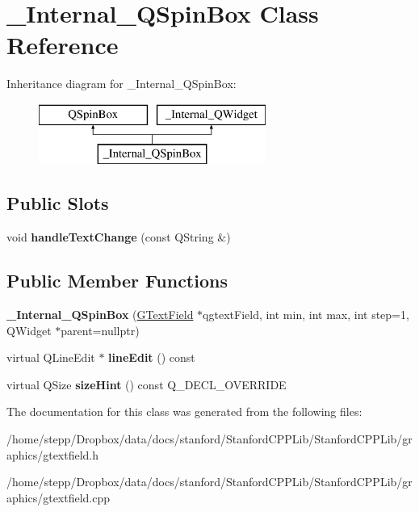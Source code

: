 \hypertarget{class__Internal__QSpinBox}{}\section{\+\_\+\+Internal\+\_\+\+Q\+Spin\+Box Class Reference}
\label{class__Internal__QSpinBox}
Inheritance diagram for \+\_\+\+Internal\+\_\+\+Q\+Spin\+Box\+:\begin{figure}[H]
\begin{center}
\leavevmode
\includegraphics[height=2.000000cm]{class__Internal__QSpinBox}
\end{center}
\end{figure}
\subsection*{Public Slots}
\begin{DoxyCompactItemize}
\item 
\mbox{\label{class__Internal__QSpinBox_a9f60f5f04e100b6b549acf913ab000c5}} 
void {\bfseries handle\+Text\+Change} (const Q\+String \&)
\end{DoxyCompactItemize}
\subsection*{Public Member Functions}
\begin{DoxyCompactItemize}
\item 
\mbox{\label{class__Internal__QSpinBox_a1d9a07027f6b5dfbd4f99e059829fe61}} 
{\bfseries \+\_\+\+Internal\+\_\+\+Q\+Spin\+Box} (\mbox{\hyperlink{classGTextField}{G\+Text\+Field}} $\ast$qgtext\+Field, int min, int max, int step=1, Q\+Widget $\ast$parent=nullptr)
\item 
\mbox{\label{class__Internal__QSpinBox_adda70e8055feb0cb750c8cf4d57664c5}} 
virtual Q\+Line\+Edit $\ast$ {\bfseries line\+Edit} () const
\item 
\mbox{\label{class__Internal__QSpinBox_ad25d592063bf322041aa8fe4db3839f7}} 
virtual Q\+Size {\bfseries size\+Hint} () const Q\+\_\+\+D\+E\+C\+L\+\_\+\+O\+V\+E\+R\+R\+I\+DE
\end{DoxyCompactItemize}


The documentation for this class was generated from the following files\+:\begin{DoxyCompactItemize}
\item 
/home/stepp/\+Dropbox/data/docs/stanford/\+Stanford\+C\+P\+P\+Lib/\+Stanford\+C\+P\+P\+Lib/graphics/gtextfield.\+h\item 
/home/stepp/\+Dropbox/data/docs/stanford/\+Stanford\+C\+P\+P\+Lib/\+Stanford\+C\+P\+P\+Lib/graphics/gtextfield.\+cpp\end{DoxyCompactItemize}
